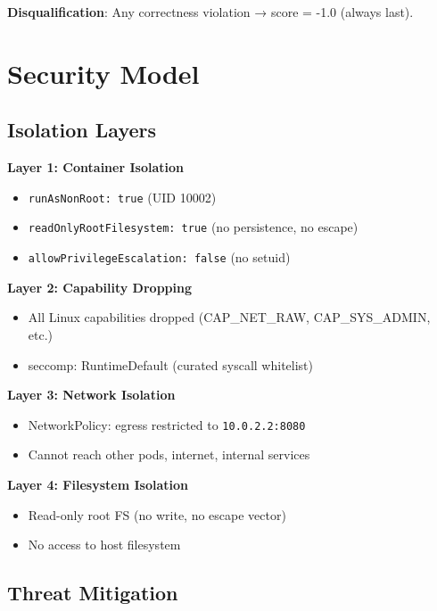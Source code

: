 \documentclass[10pt,a4paper,oneside]{report}
\begin{document}
\textbf{Disqualification}: Any correctness violation → score = -1.0 (always last).

\chapter{Security Model}

\section{Isolation Layers}

\textbf{Layer 1: Container Isolation}
\begin{itemize}
    \item \texttt{runAsNonRoot: true} (UID 10002)
    \item \texttt{readOnlyRootFilesystem: true} (no persistence, no escape)
    \item \texttt{allowPrivilegeEscalation: false} (no setuid)
\end{itemize}

\textbf{Layer 2: Capability Dropping}
\begin{itemize}
    \item All Linux capabilities dropped (CAP\_NET\_RAW, CAP\_SYS\_ADMIN, etc.)
    \item seccomp: RuntimeDefault (curated syscall whitelist)
\end{itemize}

\textbf{Layer 3: Network Isolation}
\begin{itemize}
    \item NetworkPolicy: egress restricted to \texttt{10.0.2.2:8080}
    \item Cannot reach other pods, internet, internal services
\end{itemize}

\textbf{Layer 4: Filesystem Isolation}
\begin{itemize}
    \item Read-only root FS (no write, no escape vector)
    \item No access to host filesystem
\end{itemize}

\section{Threat Mitigation}
\end{document}
